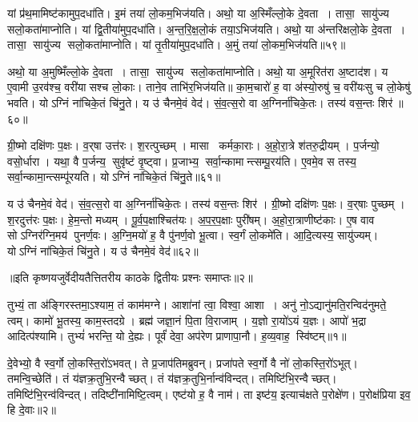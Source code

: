    यां प्र॑थ॒मामिष्ट॑कामुप॒दधा॑ति।
   इ॒मं तया॑ लो॒कम॒भिज॑यति।
   अथो॒ या अ॒स्मिँल्लो॒के दे॒वता।
   तासा॒ सायु॑ज्य सलो॒कता॑माप्नोति।
   यां द्वि॒तीया॑मुप॒दधा॑ति।
   अ॒न्त॒रि॒क्ष॒लो॒कं तया॒ऽभिज॑यति।
   अथो॒ या अ॑न्तरिक्षलो॒के दे॒वता।
   तासा॒ सायु॑ज्य सलो॒कता॑माप्नोति।
   यां तृ॒तीया॑मुप॒दधा॑ति।
   अ॒मुं तया॑ लो॒कम॒भिज॑यति॥५९॥

   अथो॒ या अ॒मुष्मिँल्लो॒के दे॒वता।
   तासा॒ सायु॑ज्य सलो॒कता॑मा\-प्नोति।
   अथो॒ या अ॒मूरित॑रा अ॒ष्टाद॑श।
   य ए॒वामी उ॒रव॑श्च॒ वरी॑यासश्च लो॒काः।
   ताने॒व ताभि॑र॒भिज॑यति॥
   का॒म॒चारो॑ ह॒ वा अ॑स्यो॒रुषु॑ च॒ वरी॑यःसु च लो॒केषु॑ भवति।
   योऽग्निं ना॑चिके॒तं चि॑नु॒ते।
   य उ॑ चैनमे॒वं वेद॑।
   सं॒व॒त्स॒रो वा अ॒ग्निर्ना॑चिके॒तः।
   तस्य॑ वस॒न्तः शिर॑॥६०॥

   ग्री॒ष्मो दक्षि॑णः प॒क्षः।
   व॒र्{‌}षा उत्त॑रः।
   श॒रत्पुच्छम्।
   मासा कर्मका॒राः।
   अ॒हो॒रा॒त्रे श॑तरु॒द्रीयम्।
   प॒र्जन्यो॒ वसो॒र्धारा।
   यथा॒ वै प॒र्जन्य॒ सुवृ॑ष्टं वृ॒ष्ट्वा।
   प्र॒जाभ्य॒ सर्वा॒न्कामान्त्सम्पू॒रय॑ति।
   ए॒वमे॒व स तस्य॒ सर्वा॒न्कामा॒न्त्सम्पू॑रयति।
   योऽग्निं ना॑चिके॒तं चि॑नु॒ते॥६१॥

   य उ॑ चैनमे॒वं वेद॑।
   सं॒व॒त्स॒रो वा अ॒ग्निर्ना॑चिके॒तः।
   तस्य॑ वस॒न्तः शिर॑।
   ग्री॒ष्मो दक्षि॑णः प॒क्षः।
   व॒र्{‌}षाः पुच्छम्।
   श॒रदुत्त॑रः प॒क्षः।
   हे॒म॒न्तो मध्यम्।
   पू॒र्व॒प॒क्षाश्चित॑यः।
   अ॒प॒र॒प॒क्षाः पुरी॑षम्।
   अ॒हो॒रा॒त्राणीष्ट॑काः।
   ए॒ष वाव सोऽग्निर॑ग्नि॒मय॑ पुनर्ण॒वः।
   अ॒ग्नि॒मयो॑ ह॒ वै पु॑नर्ण॒वो भू॒त्वा।
   स्व॒र्गं लो॒कमे॑ति।
   आ॒दि॒त्यस्य॒ सायु॑ज्यम्।
   योऽग्निं ना॑चिके॒तं चि॑नु॒ते।
   य उ॑ चैनमे॒वं वेद॑॥६२॥
\anuvakamend

  ॥इति कृष्णयजुर्वेदीयतैत्तितरीय काठके द्वितीयः प्रश्नः समाप्तः॥२॥


\setcounter{anuvakam}{0}

   तुभ्यं॒ ता अ॑ङ्गिरस्तमा॒ऽश्याम॒ तं काम॑मग्ने।
   आशा॑नां त्वा॒ विश्वा॒ आशा।
   अनु॑ नो॒ऽद्यानु॑मति॒रन्विद॑नुमते॒ त्वम्।
   कामो॑ भू॒तस्य॒ काम॒स्तदग्रे।
   ब्रह्म॑ जज्ञा॒नं पि॒ता वि॒राजाम्।
   य॒ज्ञो रा॒यो॑ऽयं य॒ज्ञः।
   आपो॑ भ॒द्रा आदित्प॑श्यामि।
   तुभ्यं॑ भरन्ति॒ यो दे॒ह्यः।
   पूर्वं॑ देवा॒ अप॑रेण प्राणापा॒नौ।
   ह॒व्य॒वाह॒ स्वि॑ष्टम्॥१॥
   \anuvakamend
  

   दे॒वेभ्यो॒ वै स्व॒र्गो लो॒कस्ति॒रो॑ऽभवत्।
   ते प्र॒जाप॑तिमब्रुवन्।
   प्रजा॑पते स्व॒र्गो वै नो॑ लो॒कस्ति॒रो॑ऽभूत्।
   तमन्वि॒च्छेति॑।
   तं य॑ज्ञक्र॒तुभि॒रन्वैच्छत्।
   तं य॑ज्ञक्र॒तुभि॒र्नान्व॑विन्दत्।
   तमिष्टि॑भि॒रन्वैच्छत्।
   तमिष्टि॑भि॒रन्व॑विन्दत्।
   तदिष्टी॑नामिष्टि॒त्वम्।
   एष्ट॑यो ह॒ वै नाम॑।
   ता इष्ट॑य॒ इत्याच॑क्षते प॒रोक्षे॑ण।
   प॒रोक्ष॑प्रिया इव॒ हि दे॒वाः॥२॥

